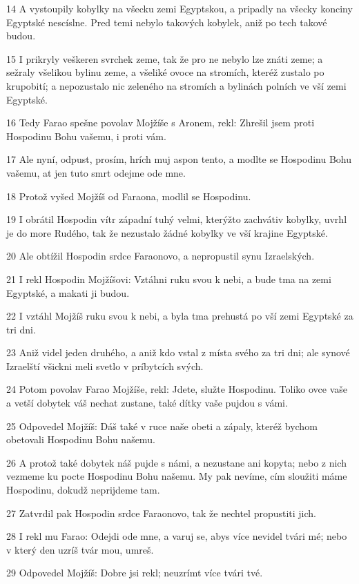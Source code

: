 \par 14 A vystoupily kobylky na všecku zemi Egyptskou, a pripadly na všecky konciny Egyptské nescíslne. Pred temi nebylo takových kobylek, aniž po tech takové budou.
\par 15 I prikryly veškeren svrchek zeme, tak že pro ne nebylo lze znáti zeme; a sežraly všelikou bylinu zeme, a všeliké ovoce na stromích, kteréž zustalo po krupobití; a nepozustalo nic zeleného na stromích a bylinách polních ve vší zemi Egyptské.
\par 16 Tedy Farao spešne povolav Mojžíše s Aronem, rekl: Zhrešil jsem proti Hospodinu Bohu vašemu, i proti vám.
\par 17 Ale nyní, odpust, prosím, hrích muj aspon tento, a modlte se Hospodinu Bohu vašemu, at jen tuto smrt odejme ode mne.
\par 18 Protož vyšed Mojžíš od Faraona, modlil se Hospodinu.
\par 19 I obrátil Hospodin vítr západní tuhý velmi, kterýžto zachvátiv kobylky, uvrhl je do more Rudého, tak že nezustalo žádné kobylky ve vší krajine Egyptské.
\par 20 Ale obtížil Hospodin srdce Faraonovo, a nepropustil synu Izraelských.
\par 21 I rekl Hospodin Mojžíšovi: Vztáhni ruku svou k nebi, a bude tma na zemi Egyptské, a makati ji budou.
\par 22 I vztáhl Mojžíš ruku svou k nebi, a byla tma prehustá po vší zemi Egyptské za tri dni.
\par 23 Aniž videl jeden druhého, a aniž kdo vstal z místa svého za tri dni; ale synové Izraelští všickni meli svetlo v príbytcích svých.
\par 24 Potom povolav Farao Mojžíše, rekl: Jdete, služte Hospodinu. Toliko ovce vaše a vetší dobytek váš nechat zustane, také dítky vaše pujdou s vámi.
\par 25 Odpovedel Mojžíš: Dáš také v ruce naše obeti a zápaly, kteréž bychom obetovali Hospodinu Bohu našemu.
\par 26 A protož také dobytek náš pujde s námi, a nezustane ani kopyta; nebo z nich vezmeme ku pocte Hospodinu Bohu našemu. My pak nevíme, cím sloužiti máme Hospodinu, dokudž neprijdeme tam.
\par 27 Zatvrdil pak Hospodin srdce Faraonovo, tak že nechtel propustiti jich.
\par 28 I rekl mu Farao: Odejdi ode mne, a varuj se, abys více nevidel tvári mé; nebo v který den uzríš tvár mou, umreš.
\par 29 Odpovedel Mojžíš: Dobre jsi rekl; neuzrímt více tvári tvé.

